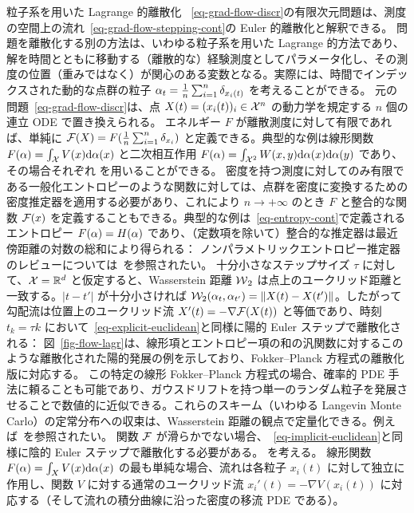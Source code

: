 \begin{rem1}{粒子系を用いた Lagrange 的離散化}\label{rem-lagr-discretization}
~\eqref{eq-grad-flow-discr}の有限次元問題は、測度の空間上の流れ~\eqref{eq-grad-flow-stepping-cont}の Euler 的離散化と解釈できる。
問題を離散化する別の方法は、いわゆる粒子系を用いた Lagrange 的方法であり、解を時間とともに移動する（離散的な）経験測度としてパラメータ化し、その測度の位置（重みではなく）が関心のある変数となる。実際には、時間でインデックスされた動的な点群の粒子 $\alpha_t = \frac{1}{n}\sum_{i=1}^n \delta_{x_i(t)}$ を考えることができる。
元の問題~\eqref{eq-grad-flow-discr}は、点 $X(t)=(x_i(t))_i \in \mathcal{X}^n$ の動力学を規定する $n$ 個の連立 ODE で置き換えられる。
エネルギー $F$ が離散測度に対して有限であれば、単純に $\mathcal{F}(X)=F( \frac{1}{n}\sum_{i=1}^n \delta_{x_i} )$ と定義できる。典型的な例は線形関数 $F(\alpha) = \int_{\mathcal{X}} V(x) \mathrm{d}\alpha(x)$ と二次相互作用 $F(\alpha) = \int_{\mathcal{X}^2} W(x,y) \mathrm{d}\alpha(x)\mathrm{d}\alpha(y)$ であり、その場合それぞれ
を用いることができる。
密度を持つ測度に対してのみ有限である一般化エントロピーのような関数に対しては、点群を密度に変換するための密度推定器を適用する必要があり、これにより $n \rightarrow +\infty$ のとき $F$ と整合的な関数 $\mathcal{F}(x)$ を定義することもできる。典型的な例は~\eqref{eq-entropy-cont}で定義されるエントロピー $F(\alpha) = H(\alpha)$ であり、（定数項を除いて）整合的な推定器は最近傍距離の対数の総和により得られる：
ノンパラメトリックエントロピー推定器のレビューについては~\citet{beirlant1997nonparametric}を参照されたい。
十分小さなステップサイズ $\tau$ に対して、$\mathcal{X}=\mathbb{R}^d$ と仮定すると、Wasserstein 距離 $\operatorname{\mathcal{W}}_2$ は点上のユークリッド距離と一致する。\ie $|t-t'|$ が十分小さければ $\mathcal{W}_2(\alpha_t,\alpha_{t'})=\left\| X(t)-X(t') \right\|$。したがって勾配流は位置上のユークリッド流 $X'(t) = -\nabla \mathcal{F}(X(t))$ と等価であり、時刻 $t_k=\tau k$ において~\eqref{eq-explicit-euclidean}と同様に陽的 Euler ステップで離散化される：
図~\ref{fig-flow-lagr}は、線形項とエントロピー項の和の汎関数に対するこのような離散化された陽的発展の例を示しており、Fokker--Planck 方程式の離散化版に対応する。
この特定の線形 Fokker--Planck 方程式の場合、確率的 PDE 手法に頼ることも可能であり、ガウスドリフトを持つ単一のランダム粒子を発展させることで数値的に近似できる。これらのスキーム（いわゆる Langevin Monte Carlo）の定常分布への収束は、Wasserstein 距離の観点で定量化できる。例えば~\citep{dalalyan2017user}を参照されたい。
関数 $\mathcal{F}$ が滑らかでない場合、~\eqref{eq-implicit-euclidean}と同様に陰的 Euler ステップで離散化する必要がある。\ie
{}
を考える。
線形関数 $F(\alpha) = \int_X V(x) \mathrm{d}\alpha(x)$ の最も単純な場合、流れは各粒子 $x_i(t)$ に対して独立に作用し、関数 $V$ に対する通常のユークリッド流 $x_i'(t)=-\nabla V(x_i(t))$ に対応する（そして流れの積分曲線に沿った密度の移流 PDE である）。
\end{rem1}

